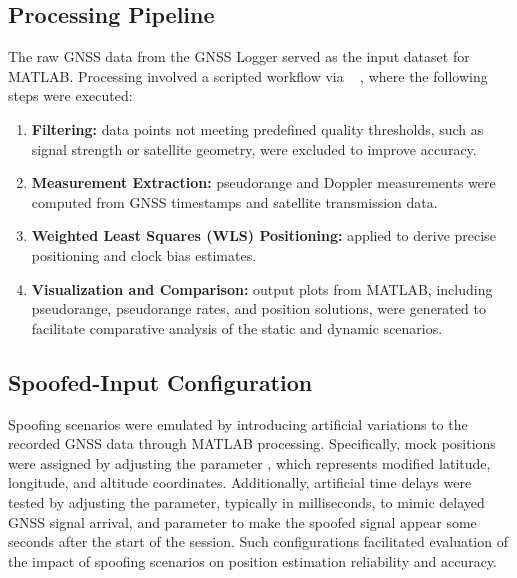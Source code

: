     \vspace{-0.2cm}

    \subsection{Processing Pipeline}
    
        The raw GNSS data from the GNSS Logger served as the input dataset for MATLAB. 
        Processing involved a scripted workflow via ~\cite{LabGNSSRepo}
        , where the following steps were executed:

        \begin{enumerate}
            \item \textbf{Filtering:} data points not meeting predefined quality thresholds, such as signal strength or satellite geometry, were excluded to improve accuracy.
            \item \textbf{Measurement Extraction:} pseudorange and Doppler measurements were computed from GNSS timestamps and satellite transmission data.
            \item \textbf{Weighted Least Squares (WLS) Positioning:} applied to derive precise positioning and clock bias estimates.
            \item \textbf{Visualization and Comparison:} output plots from MATLAB, including pseudorange, pseudorange rates, and position solutions, were generated to facilitate comparative analysis of the static and dynamic scenarios.
        \end{enumerate}

    
    \vspace{-0.1cm}

    \subsection{Spoofed-Input Configuration}

        Spoofing scenarios were emulated by introducing artificial variations to the recorded GNSS data through MATLAB processing. 
        Specifically, mock positions were assigned by adjusting the parameter , which represents modified latitude, longitude, and altitude coordinates. 
        Additionally, artificial time delays were tested by adjusting the  parameter, typically in milliseconds, to mimic delayed GNSS signal arrival, and  parameter to make the spoofed signal appear some seconds after the start of the session.
        Such configurations facilitated evaluation of the impact of spoofing scenarios on position estimation reliability and accuracy.

